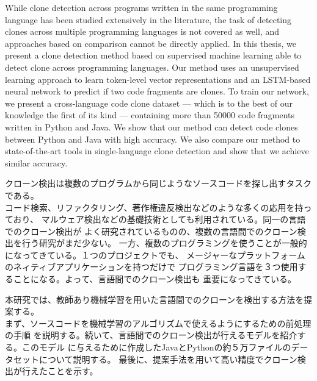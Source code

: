 \begin{eabstract}
While clone detection across programs written in the same programming language
has been studied extensively in the literature, the task of detecting clones
across multiple programming languages is not covered as well, and approaches
based on comparison cannot be directly applied.
In this thesis, we present a clone detection method based on supervised
machine learning able to detect clone across programming languages.
Our method uses an unsupervised learning approach to learn token-level vector
representations and an LSTM-based neural network to predict if two code fragments
are clones. To train our network, we present a cross-language code clone
dataset --- which is to the best of our knowledge the first of its kind ---
containing more than 50000 code fragments written in Python and Java.
We show that our method can detect code clones between Python and Java with high
accuracy. We also compare our method to state-of-the-art tools in
single-language clone detection and show that we achieve similar accuracy.
\end{eabstract}

\begin{jabstract}
クローン検出は複数のプログラムから同じようなソースコードを探し出すタスクである。\\
コード検索、リファクタリング、著作権違反検出などのような多くの応用を持っており、%
マルウェア検出などの基礎技術としても利用されている。同一の言語でのクローン検出が%
よく研究されているものの、複数の言語間でのクローン検出を行う研究がまだ少ない。%
一方、複数のプログラミングを使うことが一般的になってきている。１つのプロジェクトでも、%
メージャーなプラットフォームのネィティブアプリケーションを持つだけで%
プログラミング言語を３つ使用することになる。よって、言語間でのクローン検出も%
重要になってきている。

本研究では、教師あり機械学習を用いた言語間でのクローンを検出する方法を提案する。\\
まず、ソースコードを機械学習のアルゴリズムで使えるようにするための前処理の手順%
を説明する。続いて、言語間でのクローン検出が行えるモデルを紹介する。このモデル%
に与えるために作成したJavaとPythonの約５万ファイルのデータセットについて説明する。%
最後に、提案手法を用いて高い精度でクローン検出が行えたことを示す。
\end{jabstract}
